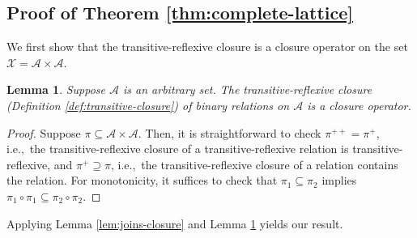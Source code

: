 \documentclass[conference]{ieeeconf}
\newcommand{\A}{\mathcal{A}}
\newcommand{\X}{\mathcal{X}}
\newtheorem{lemma}{Lemma}
\begin{document}
\vspace{-0.25em}
\subsection{Proof of Theorem \ref{thm:complete-lattice}}
\vspace{-0.25em}

We first show that the transitive-reflexive closure is a closure operator on the set $\X = \A \times \A$.

\begin{lemma} \label{lem:transitive-closure}
    Suppose $\A$ is an arbitrary set. The transitive-reflexive closure (Definition \ref{def:transitive-closure}) of binary relations on $\A$ is a closure operator.
\end{lemma}
\begin{proof}
Suppose $\pi \subseteq \A \times \A$. Then, it is straightforward to check $\pi^{++} = \pi^{+}$, i.e.,~the transitive-reflexive closure of a transitive-reflexive relation is transitive-reflexive, and $\pi^{+} \supseteq \pi$, i.e.,~the transitive-reflexive closure of a relation contains the relation. For monotonicity, it suffices to check that $\pi_1 \subseteq \pi_2$ implies $\pi_1 \circ \pi_1 \subseteq \pi_2 \circ \pi_2$.
\end{proof}

Applying Lemma \ref{lem:joins-closure} and Lemma \ref{lem:transitive-closure} yields our result.
\end{document}
